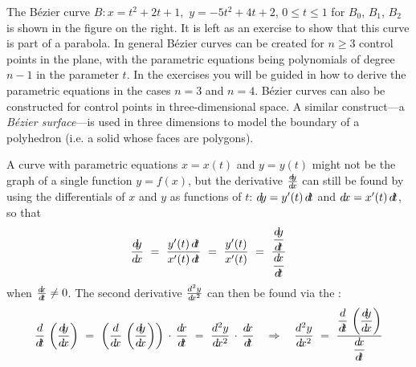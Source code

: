 \begin{exmp}
The B\'{e}zier curve $B: x=t^2 + 2t + 1,$ $y=-5t^2 + 4t + 2$, $0 \le t \le 1$
for $B_0$, $B_1$, $B_2$ is shown in the figure on the right. It is left as an
exercise to show that this curve is part of a parabola. In general B\'{e}zier
curves can be created for $n \ge 3$ control points in the plane, with the
parametric equations being polynomials of degree $n-1$ in the parameter $t$. In
the exercises you will be guided in how to derive the parametric equations in
the cases $n=3$ and $n=4$. B\'{e}zier curves can also be constructed for
control points in three-dimensional space. A similar construct---a
\emph{B\'{e}zier surface}---is used in three dimensions to model the boundary of
a polyhedron (i.e. a solid whose faces are polygons).
\end{exmp}
\divider
\newpage
A curve with parametric equations $x=x(t)$ and $y=y(t)$ might not be the graph
of a single function $y=f(x)$, but the derivative $\frac{d\negmedspace y}{d\!x}$ can still be found by
using the differentials of $x$ and $y$ as functions of $t$: $d\!y=y'(t)\,d\!t$ and
$d\!x=x'(t)\,d\!t$, so that
\begin{equation}\label{eqn:paramderiv1}
\dydx ~=~ \frac{y'(t)\,\dt}{x'(t)\,\dt} ~=~ \frac{y'(t)}{x'(t)}
~=~ \frac{\Dydt}{\Dxdt}
\end{equation}
when $\frac{d\negmedspace x}{d\!t} \ne 0$. The second derivative $\frac{d^2y}{d\!x^2}$ can then be found
via the :
\begin{equation}\label{eqn:paramderiv2}
\ddt\,\left(\dydx\right) ~=~ \left(\ddx\,\left(\dydx\right)\right)\,\cdot\,\dxdt ~=~
\frac{d^2y}{\dx^2} \,\cdot\,\dxdt \quad\Rightarrow\quad
\frac{d^2y}{\dx^2} ~=~ \frac{\Ddt\,\left(\Dydx\right)}{\Dxdt}
\end{equation}

